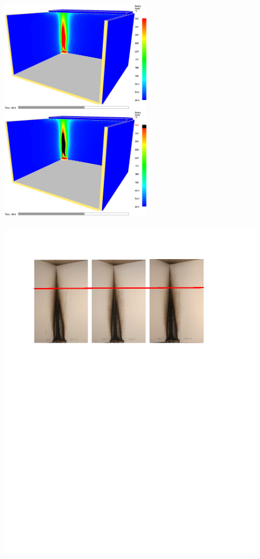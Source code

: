 \documentclass[twoside]{uocthesis}
\begin{document}
{\begin{figure}[h]
  \centering
  \includegraphics[width=2.5in]{../Figures/10}
  \includegraphics[width=2.5in]{../Figures/11}\\
  \hspace{4 mm}  \\ 
  \includegraphics[width=.8\columnwidth]{../Figures/NGCorner_guideline}\\

\end{figure}}
\end{document}
